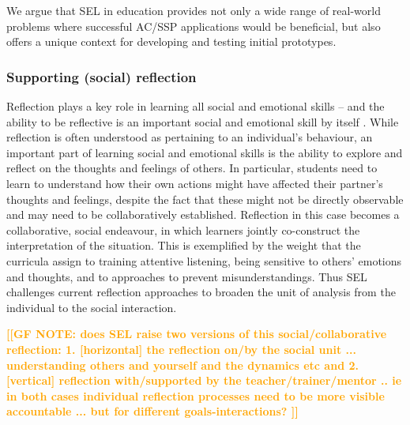 \documentclass[prodmode,acmtochi]{acmsmall}
\newcommand{\Geraldine}[1]{\textrm{\textbf{\textcolor{Orange}{[[#1]]}}}}
\begin{document}
We argue that SEL in education provides not only a wide range of real-world problems where successful AC/SSP applications would be beneficial, but also offers a unique context for developing and testing initial prototypes. 



 
 

\subsubsection{Supporting (social) reflection}
\label{sec:socialReflection}


Reflection plays a key role in learning all social and emotional skills -- and the ability to be reflective is an important social and emotional skill by itself \cite{Cohen2001,Pasi2001}.  While reflection is often understood as pertaining to an individual's behaviour, an important part of learning social and emotional skills is the ability to explore and reflect on the thoughts and feelings of others. In particular, students need to learn to understand how their own actions might have affected their partner's thoughts and feelings, despite the fact that these might not be directly observable and may need to be collaboratively established. Reflection in this case becomes a collaborative, social endeavour, in which learners jointly co-construct the interpretation of the situation.
This is exemplified by the weight that the curricula assign to training attentive listening, being sensitive to others' emotions and thoughts, and to approaches to prevent misunderstandings. Thus SEL challenges current reflection approaches to broaden the unit of analysis from the individual to the social interaction. 
%

\Geraldine{GF NOTE: does SEL raise two versions of this social/collaborative reflection: 1. [horizontal] the reflection on/by the social unit ... understanding others and yourself and the dynamics etc and 2. [vertical] reflection with/supported by the teacher/trainer/mentor .. ie in both cases individual reflection processes need to be more visible accountable ... but for different goals-interactions? }
\end{document}
